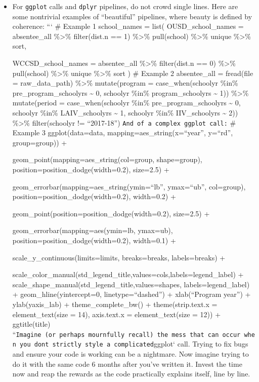 \documentclass[]{book}
\begin{document}
\begin{itemize}
\item
  For \texttt{ggplot} calls and \texttt{dplyr} pipelines, do not crowd
  single lines. Here are some nontrivial examples of ``beautiful''
  pipelines, where beauty is defined by coherence: ``` \# Example 1
  school\_names = list( OUSD\_school\_names = absentee\_all
  \%\textgreater{}\% filter(dist.n == 1) \%\textgreater{}\% pull(school)
  \%\textgreater{}\% unique \%\textgreater{}\% sort,

  WCCSD\_school\_names = absentee\_all \%\textgreater{}\% filter(dist.n
  == 0) \%\textgreater{}\% pull(school) \%\textgreater{}\% unique
  \%\textgreater{}\% sort ) \texttt{} \# Example 2 absentee\_all =
  fread(file = raw\_data\_path) \%\textgreater{}\% mutate(program =
  case\_when(schoolyr \%in\% pre\_program\_schoolyrs \textasciitilde{}
  0, schoolyr \%in\% program\_schoolyrs \textasciitilde{} 1))
  \%\textgreater{}\% mutate(period = case\_when(schoolyr \%in\%
  pre\_program\_schoolyrs \textasciitilde{} 0, schoolyr \%in\%
  LAIV\_schoolyrs \textasciitilde{} 1, schoolyr \%in\% IIV\_schoolyrs
  \textasciitilde{} 2)) \%\textgreater{}\% filter(schoolyr !=
  ``2017-18'')
  \texttt{And\ of\ a\ complex\ \textasciigrave{}ggplot\textasciigrave{}\ call:}
  \# Example 3 ggplot(data=data, mapping=aes\_string(x=``year'',
  y=``rd'', group=group)) +

  geom\_point(mapping=aes\_string(col=group, shape=group),
  position=position\_dodge(width=0.2), size=2.5) +

  geom\_errorbar(mapping=aes\_string(ymin=``lb'', ymax=``ub'',
  col=group), position=position\_dodge(width=0.2), width=0.2) +

  geom\_point(position=position\_dodge(width=0.2), size=2.5) +

  geom\_errorbar(mapping=aes(ymin=lb, ymax=ub),
  position=position\_dodge(width=0.2), width=0.1) +

  scale\_y\_continuous(limits=limits, breaks=breaks, labels=breaks) +

  scale\_color\_manual(std\_legend\_title,values=cols,labels=legend\_label)
  + scale\_shape\_manual(std\_legend\_title,values=shapes,
  labels=legend\_label) + geom\_hline(yintercept=0, linetype=``dashed'')
  + xlab(``Program year'') + ylab(yaxis\_lab) + theme\_complete\_bw() +
  theme(strip.text.x = element\_text(size = 14), axis.text.x =
  element\_text(size = 12)) + ggtitle(title)
  ``\texttt{Imagine\ (or\ perhaps\ mournfully\ recall)\ the\ mess\ that\ can\ occur\ when\ you\ don\textquotesingle{}t\ strictly\ style\ a\ complicated}ggplot`
  call. Trying to fix bugs and ensure your code is working can be a
  nightmare. Now imagine trying to do it with the same code 6 months
  after you've written it. Invest the time now and reap the rewards as
  the code practically explains itself, line by line.
\end{itemize}
\end{document}
